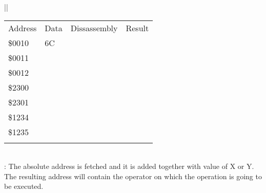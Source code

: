 \documentclass[letterpaper,10pt,english]{sphinxmanual}
\begin{document}
\begin{savenotes}
\begin{tabular}[t]{|*{1}{|}}
\sphinxAtStartPar
{}


\begin{savenotes}\sphinxattablestart
\sphinxthistablewithglobalstyle
\centering
\begin{tabulary}{\linewidth}[t]{|T|T|T|T|}
\sphinxtoprule
\sphinxstyletheadfamily 
\sphinxAtStartPar
Address
&\sphinxstyletheadfamily 
\sphinxAtStartPar
Data
&\sphinxstyletheadfamily 
\sphinxAtStartPar
Dissassembly
&\sphinxstyletheadfamily 
\sphinxAtStartPar
Result
\\
\sphinxmidrule
\sphinxtableatstartofbodyhook
\sphinxAtStartPar
\$0010
&
\sphinxAtStartPar
6C
&%
&%
\\
\sphinxAtStartPar
\$0011
&
&&\\
\sphinxAtStartPar
\$0012
&
&&\\
\sphinxAtStartPar
\$2300
&
&&\\
\sphinxAtStartPar
\$2301
&
&&\\
\sphinxAtStartPar
\$1234
&
&&\\
\sphinxAtStartPar
\$1235
&
&&\\
\sphinxbottomrule
\end{tabulary}
\sphinxtableafterendhook\par
\sphinxattableend\end{savenotes}
\\
\sphinxhline
\sphinxAtStartPar
{}: The absolute
address is fetched and it is added together with value of X or Y. The
resulting address will contain the operator on which the operation is
going to be executed.


\end{tabular}
\end{savenotes}
\end{document}
